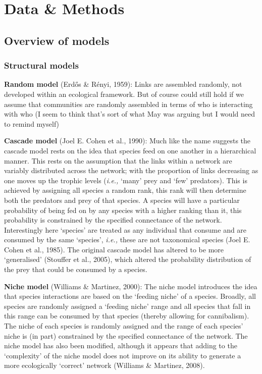 \documentclass[
]{agujournal2019}
\begin{document}
\section{Data \& Methods}\label{sec-data-methods}

\subsection{Overview of models}\label{overview-of-models}

\subsubsection{Structural models}\label{structural-models}

\textbf{Random model} (Erdős \& Rényi, 1959): Links are assembled
randomly, not developed within an ecological framework. But of course
could still hold if we assume that communities are randomly assembled in
terms of who is interacting with who (I seem to think that's sort of
what May was arguing but I would need to remind myself)

\textbf{Cascade model} (Joel E. Cohen et al., 1990): Much like the name
suggests the cascade model rests on the idea that species feed on one
another in a hierarchical manner. This rests on the assumption that the
links within a network are variably distributed across the network; with
the proportion of links decreasing as one moves up the trophic levels
(\emph{i.e.,} `many' prey and `few' predators). This is achieved by
assigning all species a random rank, this rank will then determine both
the predators and prey of that species. A species will have a particular
probability of being fed on by any species with a higher ranking than
it, this probability is constrained by the specified connectance of the
network. Interestingly here `species' are treated as any individual that
consume and are consumed by the same `species', \emph{i.e.,} these are
not taxonomical species (Joel E. Cohen et al., 1985). The original
cascade model has altered to be more `generalised' (Stouffer et al.,
2005), which altered the probability distribution of the prey that could
be consumed by a species.

\textbf{Niche model} (Williams \& Martinez, 2000): The niche model
introduces the idea that species interactions are based on the `feeding
niche' of a species. Broadly, all species are randomly assigned a
`feeding niche' range and all species that fall in this range can be
consumed by that species (thereby allowing for cannibalism). The niche
of each species is randomly assigned and the range of each species'
niche is (in part) constrained by the specified connectance of the
network. The niche model has also been modified, although it appears
that adding to the `complexity' of the niche model does not improve on
its ability to generate a more ecologically `correct' network (Williams
\& Martinez, 2008).
\end{document}
